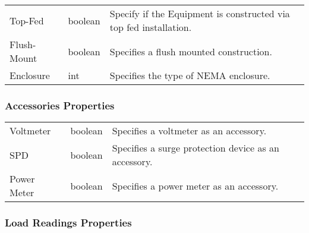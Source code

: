 \documentclass[letterpaper,10pt,english]{sphinxmanual}
\begin{document}
\begin{savenotes}\sphinxattablestart
\centering
\begin{tabulary}{\linewidth}[t]{|T|T|T|}
\hline

&
&
\\
\hline
Top-Fed
&
boolean
&
Specify if the Equipment is constructed via top fed installation.
\\
\hline
Flush-Mount
&
boolean
&
Specifies a flush mounted construction.
\\
\hline
Enclosure
&
int
&
Specifies the type of NEMA enclosure.
\\
\hline
\end{tabulary}
\par
\sphinxattableend\end{savenotes}


\subsubsection{Accessories Properties}
\label{\detokenize{docs/definitions/index-definitions:accessories-properties}}\label{\detokenize{docs/definitions/index-definitions:accessories-properties-definitions}}

\begin{savenotes}\sphinxattablestart
\centering
\begin{tabulary}{\linewidth}[t]{|T|T|T|}
\hline

&
&
\\
\hline
Voltmeter
&
boolean
&
Specifies a voltmeter as an accessory.
\\
\hline
SPD
&
boolean
&
Specifies a surge protection device as an accessory.
\\
\hline
Power Meter
&
boolean
&
Specifies a power meter as an accessory.
\\
\hline
\end{tabulary}
\par
\sphinxattableend\end{savenotes}


\subsubsection{Load Readings Properties}
\label{\detokenize{docs/definitions/index-definitions:load-readings-properties}}\label{\detokenize{docs/definitions/index-definitions:load-readings-properties-definitions}}
\end{document}

